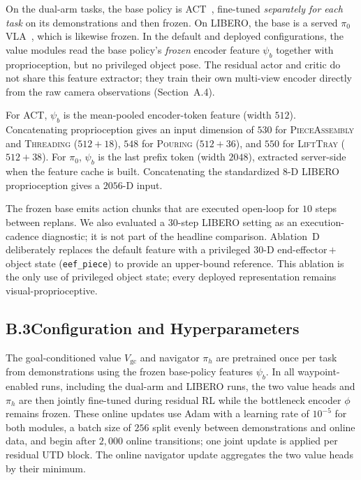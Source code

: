\documentclass[letterpaper]{article} %
\begin{document}
On the dual-arm tasks, the base policy is ACT~\cite{zhao2023learning}, fine-tuned
\emph{separately for each task} on its demonstrations and then frozen. On LIBERO, the
base is a served $\pi_0$ VLA~\cite{black2024pi0}, which is likewise frozen. In the
default and deployed configurations, the value modules read the base policy's
\emph{frozen} encoder feature $\psi_b$ together with proprioception, but no privileged
object pose. The residual actor and critic do not share this feature extractor; they
train their own multi-view encoder directly from the raw camera observations
(Section~A.4).

For ACT, $\psi_b$ is the mean-pooled encoder-token feature (width $512$). Concatenating
proprioception gives an input dimension of $530$ for
\textsc{PieceAssembly} and \textsc{Threading} ($512{+}18$), $548$ for
\textsc{Pouring} ($512{+}36$), and $550$ for \textsc{LiftTray} ($512{+}38$).
For $\pi_0$, $\psi_b$ is the last prefix token (width $2048$), extracted server-side
when the feature cache is built. Concatenating the standardized $8$-D LIBERO
proprioception gives a $2056$-D input.

The frozen base emits action chunks that are executed open-loop for $10$ steps between
replans. We also evaluated a $30$-step LIBERO setting as an execution-cadence
diagnostic; it is not part of the headline comparison. Ablation~D deliberately replaces
the default feature with a privileged $30$-D end-effector\,$+$\,object state
(\texttt{eef\_piece}) to provide an upper-bound reference. This ablation is the only
use of privileged object state; every deployed representation remains
visual-proprioceptive.

\subsection{B.3\quad Configuration and Hyperparameters}

The goal-conditioned value $V_{\mathrm{gc}}$ and navigator $\pi_h$ are
pretrained once per task from demonstrations using the frozen base-policy
features $\psi_b$. In all waypoint-enabled runs, including the dual-arm and
LIBERO runs, the two value heads and $\pi_h$ are then jointly fine-tuned during
residual RL while the bottleneck encoder $\phi$ remains frozen. These online
updates use Adam with a learning rate of $10^{-5}$ for both modules, a batch
size of $256$ split evenly between demonstrations and online data, and begin
after $2{,}000$ online transitions; one joint update is applied per residual
UTD block. The online navigator update aggregates the two value heads by their
minimum.
\end{document}
